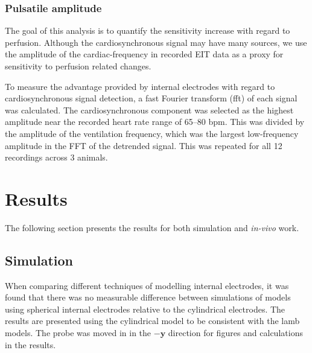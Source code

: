 \subsubsection{Pulsatile amplitude}
The goal of this analysis is to quantify the sensitivity increase with regard to perfusion. 
Although the cardiosynchronous signal may have many sources, we use the 
amplitude of the cardiac-frequency in recorded EIT data as a proxy for sensitivity to 
perfusion related changes. 

To measure the advantage provided by internal electrodes with regard to cardiosynchronous
signal detection, 
a fast Fourier transform (\acrshort{fft}) of each signal was calculated. 
The cardiosynchronous component was selected as the highest 
amplitude near the recorded heart rate range of 65--80 bpm.
This was divided by the amplitude of the ventilation frequency, which was the largest
low-frequency amplitude in the FFT of the detrended signal. 
This was repeated for all 12 recordings across 3 animals.

\section{Results}
The following section presents the results for both simulation and 
\emph{in-vivo} work.

\subsection{Simulation}
When comparing different techniques of modelling internal electrodes, 
it was found that there was no measurable difference between 
simulations of models using spherical internal electrodes 
relative to the
cylindrical electrodes. The results are presented
using the cylindrical model to be consistent with the 
lamb models.
The probe was moved in in the $-\mathbf{y}$ direction for figures and calculations
in the results.

